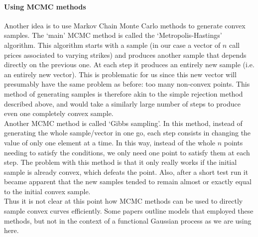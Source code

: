 \documentclass[a4paper,12pt]{article}
\begin{document}
\paragraph{Using MCMC methods}
Another idea is to use Markov Chain Monte Carlo methods to generate convex samples. The `main' MCMC method is called the `Metropolis-Hastings' algorithm. This algorithm starts with a sample (in our case a vector of $n$ call prices associated to varying strikes) and produces another sample that depends directly on the previous one. At each step it produces an entirely new sample (i.e. an entirely new vector). This is problematic for us since this new vector will presumably have the same problem as before: too many non-convex points. This method of generating samples is therefore akin to the simple rejection method described above, and would take a similarly large number of steps to produce even one completely convex sample.\\
Another MCMC method is called `Gibbs sampling'. In this method, instead of generating the whole sample/vector in one go, each step consists in changing the value of only one element at a time. In this way, instead of the whole $n$ points needing to satisfy the conditions, we only need one point to satisfy them at each step. The problem with this method is that it only really works if the initial sample is already convex, which defeats the point. Also, after a short test run it became apparent that the new samples tended to remain almost or exactly equal to the initial convex sample.\\
Thus it is not clear at this point how MCMC methods can be used to directly sample convex curves efficiently. Some papers \cite{lopezlopera} \cite{Chataigner2020BeyondSM} outline models that employed these methods, but not in the context of a functional Gaussian process as we are using here.
\end{document}

